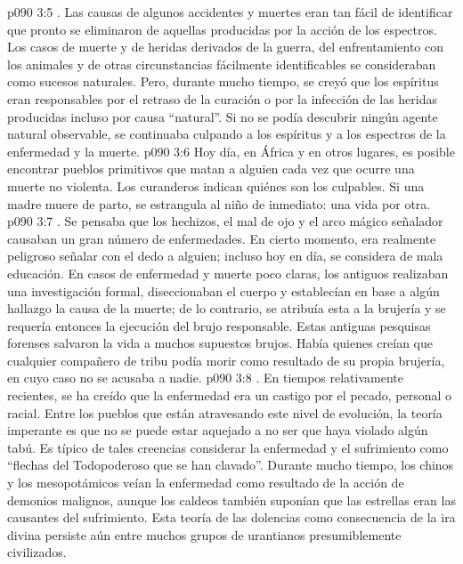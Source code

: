 \vs p090 3:5 . Las causas de algunos accidentes y muertes eran tan fácil de identificar que pronto se eliminaron de aquellas producidas por la acción de los espectros. Los casos de muerte y de heridas derivados de la guerra, del enfrentamiento con los animales y de otras circunstancias fácilmente identificables se consideraban como sucesos naturales. Pero, durante mucho tiempo, se creyó que los espíritus eran responsables por el retraso de la curación o por la infección de las heridas producidas incluso por causa “natural”. Si no se podía descubrir ningún agente natural observable, se continuaba culpando a los espíritus y a los espectros de la enfermedad y la muerte.
\vs p090 3:6 Hoy día, en África y en otros lugares, es posible encontrar pueblos primitivos que matan a alguien cada vez que ocurre una muerte no violenta. Los curanderos indican quiénes son los culpables. Si una madre muere de parto, se estrangula al niño de inmediato: una vida por otra.
\vs p090 3:7 . Se pensaba que los hechizos, el mal de ojo y el arco mágico señalador causaban un gran número de enfermedades. En cierto momento, era realmente peligroso señalar con el dedo a alguien; incluso hoy en día, se considera de mala educación. En casos de enfermedad y muerte poco claras, los antiguos realizaban una investigación formal, diseccionaban el cuerpo y establecían en base a algún hallazgo la causa de la muerte; de lo contrario, se atribuía esta a la brujería y se requería entonces la ejecución del brujo responsable. Estas antiguas pesquisas forenses salvaron la vida a muchos supuestos brujos. Había quienes creían que cualquier compañero de tribu podía morir como resultado de su propia brujería, en cuyo caso no se acusaba a nadie.
\vs p090 3:8 . En tiempos relativamente recientes, se ha creído que la enfermedad era un castigo por el pecado, personal o racial. Entre los pueblos que están atravesando este nivel de evolución, la teoría imperante es que no se puede estar aquejado a no ser que haya violado algún tabú. Es típico de tales creencias considerar la enfermedad y el sufrimiento como “flechas del Todopoderoso que se han clavado”. Durante mucho tiempo, los chinos y los mesopotámicos veían la enfermedad como resultado de la acción de demonios malignos, aunque los caldeos también suponían que las estrellas eran las causantes del sufrimiento. Esta teoría de las dolencias como consecuencia de la ira divina persiste aún entre muchos grupos de urantianos presumiblemente civilizados.
